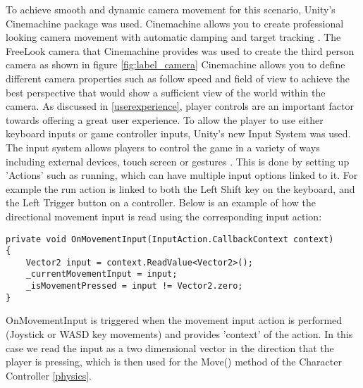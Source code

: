 \documentclass[]{final_report}
\begin{document}
To achieve smooth and dynamic camera movement for this scenario, Unity's Cinemachine package was used. Cinemachine allows you to create professional looking camera movement with automatic damping and target tracking \cite{onewheelstudio_2021}. The FreeLook camera that Cinemachine provides was used to create the third person camera as shown in figure \ref{fig:label_camera}
Cinemachine allows you to define different camera properties such as follow speed and field of view to achieve the best perspective that would show a sufficient view of the world within the camera. \newline
As discussed in \ref{userexperience}, player controls are an important factor towards offering a great user experience. To allow the player to use either keyboard inputs or game controller inputs, Unity's new Input System was used. The input system allows players to control the game in a variety of ways including external devices, touch screen or gestures \cite{unity_2024_inputsystem}. This is done by setting up 'Actions' such as running, which can have multiple input options linked to it. For example the run action is linked to both the Left Shift key on the keyboard, and the Left Trigger button on a controller. Below is an example of how the directional movement input is read using the corresponding input action:
\begin{verbatim}
private void OnMovementInput(InputAction.CallbackContext context)
{
    Vector2 input = context.ReadValue<Vector2>();
    _currentMovementInput = input;
    _isMovementPressed = input != Vector2.zero;
}
\end{verbatim}
OnMovementInput is triggered when the movement input action is performed (Joystick or WASD key movements) and provides 'context' of the action. In this case we read the input as a two dimensional vector in the direction that the player is pressing, which is then used for the Move() method of the Character Controller \ref{physics}.  \newline
\end{document}
